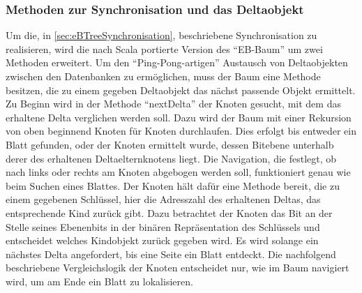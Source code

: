 \documentclass[a4paper,11pt,oneside,%
headsepline,												%
footsepline,												%
bibtotocnumbered									%
]{scrreprt}
\begin{document}
\subsubsection{Methoden zur Synchronisation und das Deltaobjekt}
Um die, in \autoref{sec:eBTreeSynchronisation}, beschriebene Synchronisation zu realisieren, wird die nach Scala portierte Version des \enquote{EB-Baum} um zwei Methoden erweitert. Um den \enquote{Ping-Pong-artigen} Austausch von Deltaobjekten zwischen den Datenbanken zu ermöglichen, muss der Baum eine Methode besitzen, die zu einem gegeben Deltaobjekt das nächst passende Objekt ermittelt. Zu Beginn wird in der Methode \enquote{nextDelta} der Knoten gesucht, mit dem das erhaltene Delta verglichen werden soll. Dazu wird der Baum mit einer Rekursion von oben beginnend Knoten für Knoten durchlaufen. Dies erfolgt bis entweder ein Blatt gefunden, oder der Knoten ermittelt wurde, dessen Bitebene unterhalb derer des erhaltenen Deltaelternknotens liegt. Die Navigation, die festlegt, ob nach links oder rechts am Knoten abgebogen werden soll, funktioniert genau wie beim Suchen eines Blattes. Der Knoten hält dafür eine Methode bereit, die zu einem gegebenen Schlüssel, hier die Adresszahl des erhaltenen Deltas, das entsprechende Kind zurück gibt. Dazu betrachtet der Knoten das Bit an der Stelle seines Ebenenbits in der binären Repräsentation des Schlüssels und entscheidet welches Kindobjekt zurück gegeben wird. Es wird solange ein nächstes Delta angefordert, bis eine Seite ein Blatt entdeckt. Die nachfolgend beschriebene Vergleichslogik der Knoten entscheidet nur, wie im Baum navigiert wird, um am Ende ein Blatt zu lokalisieren.\\
\end{document}
